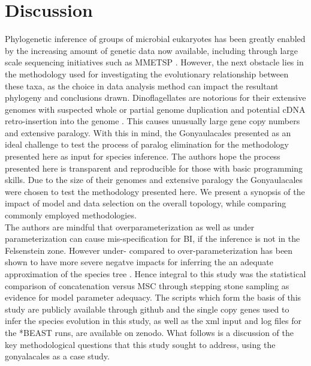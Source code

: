 \documentclass[12pt]{article}
\begin{document}
\section{Discussion}
Phylogenetic inference of groups of microbial eukaryotes has been greatly enabled by the increasing amount of genetic data now available, including through large scale sequencing initiatives such as MMETSP \cite{keeling2014marine}.
However, the next obstacle lies in the methodology used for investigating the evolutionary relationship between these taxa, as the choice in data analysis method can impact the resultant phylogeny and conclusions drawn. 
Dinoflagellates are notorious for their extensive genomes with suspected whole or partial genome duplication and potential cDNA retro-insertion into the genome \cite{van2009florida.beauchemin2012dinoflagellate,slamovits2008widespread,hou2009distinct,lin2011genomic}. 
This causes unusually large gene copy numbers and extensive paralogy. 
With this in mind, the Gonyaulacales presented as an ideal challenge to test the process of paralog elimination for the methodology presented here as input for species inference.  
The authors hope the process presented here is transparent and reproducible for those with basic programming skills. 
Due to the size of their genomes and extensive paralogy the Gonyaulacales were chosen to test the methodology presented here.
We present a synopsis of the impact of model and data selection on the overall topology, while comparing commonly employed methodologies. \\
The authors are mindful that overparameterization as well as under parameterization can cause mis-specification for BI, if the inference is not in the Felsenstein zone. 
However under- compared to over-parameterization has been shown to have  more severe negatve impacts for inferring the an adequate approximation of the species tree \cite{lemmon2004importance}. 
Hence integral to this study was the statistical comparison of concatenation versus MSC through stepping stone sampling as evidence for model parameter adequacy. 
The scripts which form the basis of this study are publicly available through github and the single copy genes used to infer the species evolution in this study, as well as the xml input and log files for the *BEAST runs, are available on zenodo. 
What follows is a discussion of the key methodological questions that this study sought to address, using the gonyalacales as a case study. 
\end{document}
